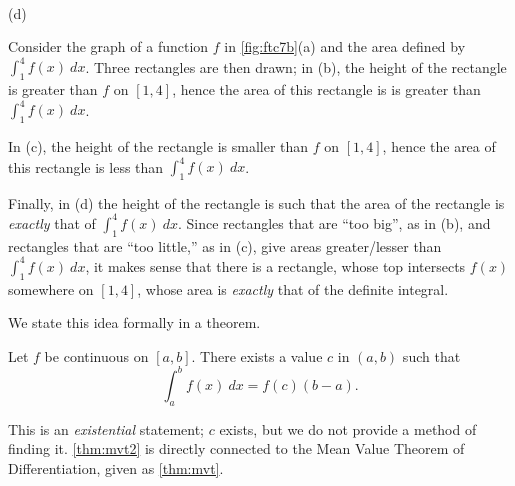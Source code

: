 {
\\(d)}

Consider the graph of a function $f$ in \autoref{fig:ftc7b}(a) and the area defined by $\int_1^4 f(x)\ dx$. Three rectangles are then drawn; in (b), the height of the rectangle is greater than $f$ on $[1,4]$, hence the area of this rectangle is is greater than $\int_1^4 f(x)\ dx$. 

In (c), the height of the rectangle is smaller than $f$ on $[1,4]$, hence the area of this rectangle is less than $\int_1^4 f(x)\ dx$.

Finally, in (d) the height of the rectangle is such that the area of the rectangle is \textit{exactly} that of $\int_1^4 f(x)\ dx$. Since rectangles that are ``too big\primeskip'', as in (b), and rectangles that are ``too little,'' as in (c), give areas greater/lesser than $\int_1^4 f(x)\ dx$, it makes sense that there is a rectangle, whose top intersects $f(x)$ somewhere on $[1,4]$, whose area is \textit{exactly} that of the definite integral.

We state this idea formally in a theorem.

{Let $f$ be continuous on $[a,b]$. There exists a value $c$ in $(a,b)$ such that
\[\int_a^bf(x)\ dx = f(c)(b-a).\]}

This is an \emph{existential} statement; $c$ exists, but we do not provide a method of finding it. \autoref{thm:mvt2} is directly connected to the Mean Value Theorem of Differentiation, given %
as \autoref{thm:mvt}. %


